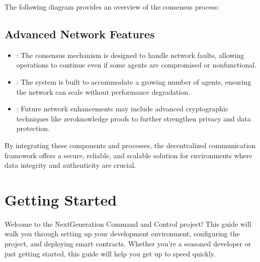 \documentclass[a4paper,10pt,english]{sphinxmanual}
\let\sphinxpxdimen\pdfpxdimen\else\newdimen\sphinxpxdimen
\begin{document}
\sphinxAtStartPar
The following diagram provides an overview of the consensus process:

\noindent{\hspace*{\fill}\sphinxincludegraphics[width=600\sphinxpxdimen]{{consensusProcess}.png}\hspace*{\fill}}


\section{Advanced Network Features}
\label{\detokenize{introduction:advanced-network-features}}\begin{itemize}
\item {} 
\sphinxAtStartPar
{}: The consensus mechanism is designed to handle network faults, allowing operations to continue even if some agents are compromised or non\sphinxhyphen{}functional.

\item {} 
\sphinxAtStartPar
{}: The system is built to accommodate a growing number of agents, ensuring the network can scale without performance degradation.

\item {} 
\sphinxAtStartPar
{}: Future network enhancements may include advanced cryptographic techniques like zero\sphinxhyphen{}knowledge proofs to further strengthen privacy and data protection.

\end{itemize}

\sphinxAtStartPar
By integrating these components and processes, the decentralized communication framework offers a secure, reliable, and scalable solution for environments where data integrity and authenticity are crucial.

\sphinxstepscope


\chapter{Getting Started}
\label{\detokenize{quickstart:getting-started}}\label{\detokenize{quickstart::doc}}
\sphinxAtStartPar
Welcome to the Next\sphinxhyphen{}Generation Command and Control project! This guide will walk you through setting up your development environment, configuring the project, and deploying smart contracts. Whether you’re a seasoned developer or just getting started, this guide will help you get up to speed quickly.
\end{document}
